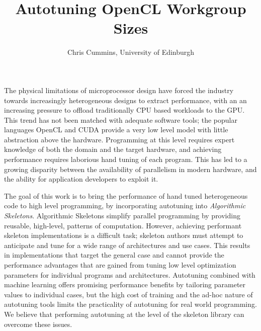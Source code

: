 %
%
%
%
%
%


\usepackage{pdfpages}



  \title{Autotuning OpenCL Workgroup Sizes}

  \author{Chris Cummins, University of Edinburgh}

  \maketitle

  The physical limitations of microprocessor design have forced the
  industry towards increasingly heterogeneous designs to extract
  performance, with an an increasing pressure to offload traditionally
  CPU based workloads to the GPU. This trend has not been matched with
  adequate software tools; the popular languages OpenCL and CUDA provide
  a very low level model with little abstraction above the
  hardware. Programming at this level requires expert knowledge of both
  the domain and the target hardware, and achieving performance requires
  laborious hand tuning of each program. This has led to a growing
  disparity between the availability of parallelism in modern hardware,
  and the ability for application developers to exploit it.

  The goal of this work is to bring the performance of hand tuned
  heterogeneous code to high level programming, by incorporating
  autotuning into \textit{Algorithmic Skeletons}. Algorithmic Skeletons
  simplify parallel programming by providing reusable, high-level,
  patterns of computation. However, achieving performant skeleton
  implementations is a difficult task; skeleton authors must attempt to
  anticipate and tune for a wide range of architectures and use
  cases. This results in implementations that target the general case
  and cannot provide the performance advantages that are gained from
  tuning low level optimization parameters for individual programs and
  architectures. Autotuning combined with machine learning offers
  promising performance benefits by tailoring parameter values to
  individual cases, but the high cost of training and the ad-hoc nature
  of autotuning tools limits the practicality of autotuning for real
  world programming. We believe that performing autotuning at the level
  of the skeleton library can overcome these issues.

